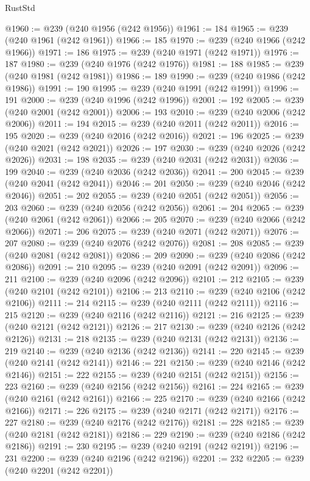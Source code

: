 \begin{lexlean}{RustStd}
\begin{coremodule}
{\begin{coremodule}
{{{{{{{{{{{{{{{{{{{{{{{{{{{{{{{{{{{{{{{{{{{{{{{{{{{{{{{{{{{{@1960 := @239 (@240 @1956 (@242 @1956))
@1961 := 184
@1965 := @239 (@240 @1961 (@242 @1961))
@1966 := 185
@1970 := @239 (@240 @1966 (@242 @1966))
@1971 := 186
@1975 := @239 (@240 @1971 (@242 @1971))
@1976 := 187
@1980 := @239 (@240 @1976 (@242 @1976))
@1981 := 188
@1985 := @239 (@240 @1981 (@242 @1981))
@1986 := 189
@1990 := @239 (@240 @1986 (@242 @1986))
@1991 := 190
@1995 := @239 (@240 @1991 (@242 @1991))
@1996 := 191
@2000 := @239 (@240 @1996 (@242 @1996))
@2001 := 192
@2005 := @239 (@240 @2001 (@242 @2001))
@2006 := 193
@2010 := @239 (@240 @2006 (@242 @2006))
@2011 := 194
@2015 := @239 (@240 @2011 (@242 @2011))
@2016 := 195
@2020 := @239 (@240 @2016 (@242 @2016))
@2021 := 196
@2025 := @239 (@240 @2021 (@242 @2021))
@2026 := 197
@2030 := @239 (@240 @2026 (@242 @2026))
@2031 := 198
@2035 := @239 (@240 @2031 (@242 @2031))
@2036 := 199
@2040 := @239 (@240 @2036 (@242 @2036))
@2041 := 200
@2045 := @239 (@240 @2041 (@242 @2041))
@2046 := 201
@2050 := @239 (@240 @2046 (@242 @2046))
@2051 := 202
@2055 := @239 (@240 @2051 (@242 @2051))
@2056 := 203
@2060 := @239 (@240 @2056 (@242 @2056))
@2061 := 204
@2065 := @239 (@240 @2061 (@242 @2061))
@2066 := 205
@2070 := @239 (@240 @2066 (@242 @2066))
@2071 := 206
@2075 := @239 (@240 @2071 (@242 @2071))
@2076 := 207
@2080 := @239 (@240 @2076 (@242 @2076))
@2081 := 208
@2085 := @239 (@240 @2081 (@242 @2081))
@2086 := 209
@2090 := @239 (@240 @2086 (@242 @2086))
@2091 := 210
@2095 := @239 (@240 @2091 (@242 @2091))
@2096 := 211
@2100 := @239 (@240 @2096 (@242 @2096))
@2101 := 212
@2105 := @239 (@240 @2101 (@242 @2101))
@2106 := 213
@2110 := @239 (@240 @2106 (@242 @2106))
@2111 := 214
@2115 := @239 (@240 @2111 (@242 @2111))
@2116 := 215
@2120 := @239 (@240 @2116 (@242 @2116))
@2121 := 216
@2125 := @239 (@240 @2121 (@242 @2121))
@2126 := 217
@2130 := @239 (@240 @2126 (@242 @2126))
@2131 := 218
@2135 := @239 (@240 @2131 (@242 @2131))
@2136 := 219
@2140 := @239 (@240 @2136 (@242 @2136))
@2141 := 220
@2145 := @239 (@240 @2141 (@242 @2141))
@2146 := 221
@2150 := @239 (@240 @2146 (@242 @2146))
@2151 := 222
@2155 := @239 (@240 @2151 (@242 @2151))
@2156 := 223
@2160 := @239 (@240 @2156 (@242 @2156))
@2161 := 224
@2165 := @239 (@240 @2161 (@242 @2161))
@2166 := 225
@2170 := @239 (@240 @2166 (@242 @2166))
@2171 := 226
@2175 := @239 (@240 @2171 (@242 @2171))
@2176 := 227
@2180 := @239 (@240 @2176 (@242 @2176))
@2181 := 228
@2185 := @239 (@240 @2181 (@242 @2181))
@2186 := 229
@2190 := @239 (@240 @2186 (@242 @2186))
@2191 := 230
@2195 := @239 (@240 @2191 (@242 @2191))
@2196 := 231
@2200 := @239 (@240 @2196 (@242 @2196))
@2201 := 232
@2205 := @239 (@240 @2201 (@242 @2201))
}}}}}}}}}}}}}}}}}}}}}}}}}}}}}}}}}}}}}}}}}}}}}}}}}}}}}}}}}}}}
\end{coremodule}}
\end{coremodule}
\end{lexlean}
